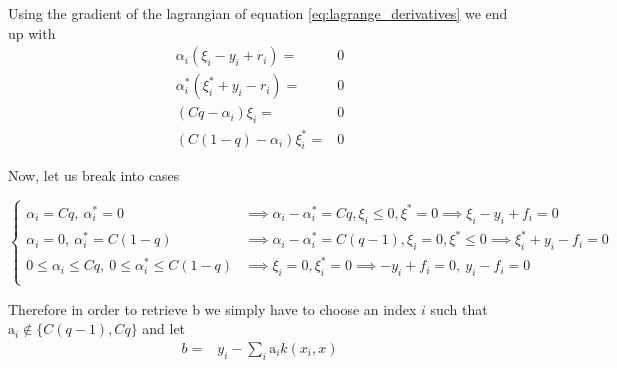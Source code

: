 Using the gradient of the lagrangian of equation \ref{eq:lagrange_derivatives} we end up with
\begin{equation}
    \begin{aligned}
        \alpha_i(\xi_i-y_i+r_i)=&0
        \\
        \alpha_i^*(\xi_i^*+y_i-r_i)=&0
        \\
        (Cq-\alpha_i) \xi_i=&0
        \\
        (C(1-q)-\alpha_i) \xi_i^*=&0
    \end{aligned}
\end{equation}

Now, let us break into cases

\begin{equation}
\begin{cases}
    \alpha_i=Cq, \ \alpha_i^*=0 & \implies \alpha_i-\alpha_i^*=Cq, \xi_i\leq 0, \xi^*=0\implies \xi_i-y_i+f_i=0 \\
    \alpha_i=0, \ \alpha_i^*=C(1-q) & \implies \alpha_i-\alpha_i^*=C(q-1), \xi_i= 0, \xi^*\leq 0 \implies \xi_i^*+y_i-f_i=0 \\
    0\leq \alpha_i\leq Cq, \ 0\leq \alpha_i^*\leq C(1-q) & \implies \xi_i=0,  \xi^*_i= 0 \implies -y_i+f_i=0, \ y_i-f_i=0 \\
\end{cases}
\end{equation}

Therefore in order to retrieve b we simply have to choose an index $i$ such that  $\textrm{a}_i \not \in \{C(q-1), Cq\}$
and let
\begin{equation}
    \begin{aligned}
    b=&y_i-\sum_i \textrm{a}_i k(x_i,x)
    \end{aligned}
\end{equation}


